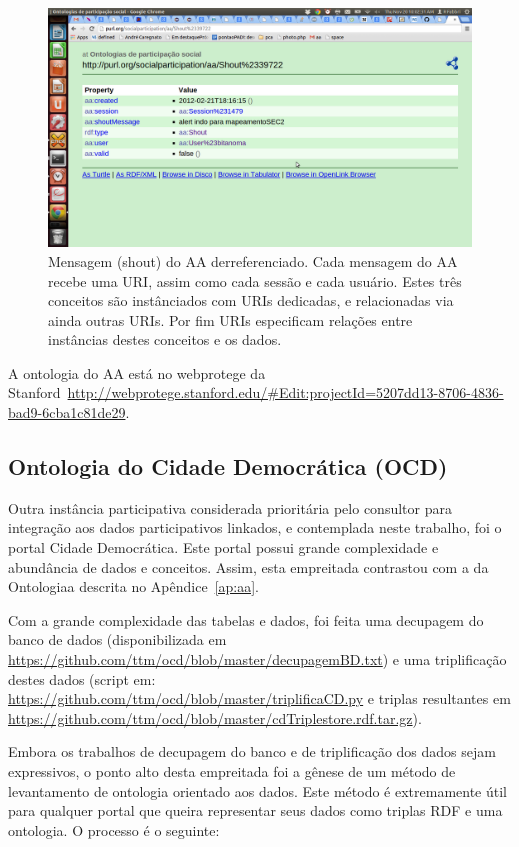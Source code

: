 \documentclass[12pt]{article}
\begin{document}
\begin{figure}[h!]
  \centering
    \includegraphics[width=\textwidth]{../figs/aaShoutPubby.png}
  \caption{Mensagem (shout) do AA derreferenciado. Cada mensagem do AA recebe uma URI, assim como cada sessão e cada usuário. Estes três conceitos são instânciados com URIs dedicadas, e relacionadas via ainda outras URIs. Por fim URIs especificam relações entre instâncias destes conceitos e os dados.}\label{fig:aashout}
\end{figure}

A ontologia do AA está no webprotege da Stanford~\url{http://webprotege.stanford.edu/#Edit:projectId=5207dd13-8706-4836-bad9-6cba1c81de29}.

\subsection{Ontologia do Cidade Democrática (OCD)}
Outra instância participativa considerada prioritária pelo consultor para integração aos dados participativos linkados, e contemplada neste trabalho, foi o portal Cidade Democrática. Este portal possui grande complexidade e abundância de dados e conceitos. Assim, esta empreitada contrastou com a da Ontologiaa descrita no Apêndice~\ref{ap:aa}.

Com a grande complexidade das tabelas e dados, foi feita uma decupagem do banco de dados (disponibilizada em \url{https://github.com/ttm/ocd/blob/master/decupagemBD.txt}) e uma triplificação destes dados (script em: \url{https://github.com/ttm/ocd/blob/master/triplificaCD.py} e triplas resultantes em \url{https://github.com/ttm/ocd/blob/master/cdTriplestore.rdf.tar.gz}).

Embora os trabalhos de decupagem do banco e de triplificação dos dados sejam expressivos, o ponto alto desta empreitada foi a gênese de um método de levantamento de ontologia orientado aos dados. Este método é extremamente útil para qualquer portal que queira representar seus dados como triplas RDF e uma ontologia. O processo é o seguinte:
\end{document}
